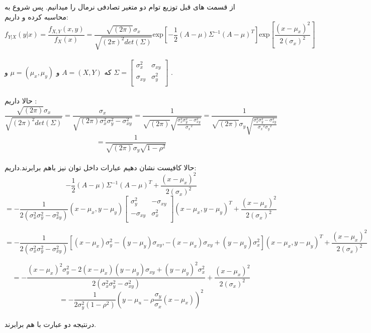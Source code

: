 \parte{}
از قسمت های قبل توزیع توام دو متغیر تصادفی نرمال را میدانیم.
پس شروع به محاسبه کرده و داریم:\\
\[
f_{Y|X}(y|x) = \frac{f_{X,Y}(x,y)}{f_X(x)} = 
\frac{\sqrt{(2\pi)}\sigma_{x}}{\sqrt{(2\pi)^2 det(\Sigma)}} 
\text{exp}[-\frac{1}{2}{(A - \mu)}{\Sigma}^{-1}(A - \mu)^{T}]
\text{exp}[\frac{(x - \mu_x)^2}{2(\sigma_{x})^2}]
\]\\
که $A = (X,Y)$ و $\mu = (\mu_x,\mu_y)$ و $\Sigma =\begin{bmatrix}
    \sigma_{x}^2 & \sigma_{xy} \\
    \sigma_{xy} & \sigma_{y}^2 \\
\end{bmatrix}$ .\\\\
حالا داریم :\\
\[ 
    \frac{\sqrt{(2\pi)}\sigma_{x}}{\sqrt{(2\pi)^2 det(\Sigma)}} =
    \frac{\sigma_{x}}{\sqrt{(2\pi) \sigma_{x}^2\sigma_{y}^2-\sigma_{xy}^2}} =
    \frac{1}{\sqrt{(2\pi)} \sqrt{\frac{\sigma_{x}^2\sigma_{y}^2-\sigma_{xy}^2}{{\sigma_x}^2}}} =
    \frac{1}{\sqrt{(2\pi)} \sigma_y \sqrt{\frac{\sigma_{x}^2\sigma_{y}^2-\sigma_{xy}^2}{{\sigma_x}^2{\sigma_y}^2}}}
\]
\[ 
    = \frac{1}{\sqrt{(2\pi)} \sigma_y \sqrt{1-\rho^2}}
\]\\
حالا کافیست نشان دهیم عبارات داخل توان نیز باهم برابرند.داریم:\\
\[
    -\frac{1}{2}{(A - \mu)}{\Sigma}^{-1}(A - \mu)^{T}+\frac{(x - \mu_x)^2}{2(\sigma_{x})^2}
\]
\[
    = -\frac{1}{2(\sigma_x^2\sigma_y^2 - \sigma_{xy}^2)}{(x-\mu_x,y-\mu_y)}
    \begin{bmatrix}
        \sigma_{y}^2 & -\sigma_{xy} \\
        -\sigma_{xy} & \sigma_{x}^2 \\
    \end{bmatrix}
    (x-\mu_x,y-\mu_y)^{T}+\frac{(x - \mu_x)^2}{2(\sigma_{x})^2}
\]

\[
    = -\frac{1}{2(\sigma_x^2\sigma_y^2 - \sigma_{xy}^2)}
    [(x-\mu_x)\sigma_y^2-(y-\mu_y)\sigma_{xy},-(x-\mu_x)\sigma_{xy}+(y-\mu_y)\sigma_{x}^2]
    (x-\mu_x,y-\mu_y)^{T}+\frac{(x - \mu_x)^2}{2(\sigma_{x})^2}
\]

\[
    = -\frac{(x-\mu_x)^2\sigma_y^2-2(x-\mu_x)(y-\mu_y)\sigma_{xy}+(y-\mu_y)^2\sigma_{x}^2}{2(\sigma_x^2\sigma_y^2 - \sigma_{xy}^2)}
    +\frac{(x - \mu_x)^2}{2(\sigma_{x})^2}
\]
\[
=-\frac{1}{2\sigma_y^2(1-\rho^2)}(y-\mu_u-\rho\frac{\sigma_y}{\sigma_x}(x-\mu_x))^2    
\]
\\
درنتیجه دو عبارت با هم برابرند.\\






